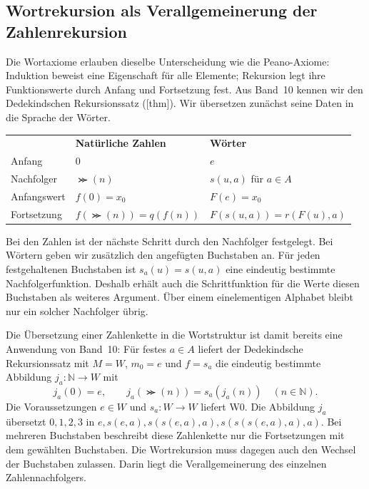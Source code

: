 \subsection{Wortrekursion als Verallgemeinerung der Zahlenrekursion}

Die Wortaxiome erlauben dieselbe Unterscheidung wie die Peano-Axiome:
Induktion beweist eine Eigenschaft für alle Elemente; Rekursion legt
ihre Funktionswerte durch Anfang und Fortsetzung fest. Aus Band~10
kennen wir den Dedekindschen Rekursionssatz
([thm]). Wir übersetzen zunächst
seine Daten in die Sprache der Wörter.

\begingroup
\renewcommand{\arraystretch}{1.2}
\setlength{\tabcolsep}{4pt}
\noindent\begin{tabular}{@{}p{.21\linewidth}p{.32\linewidth}p{.41\linewidth}@{}}
 & \textbf{Natürliche Zahlen} & \textbf{Wörter} \\
Anfang & \(0\) & \(e\) \\
Nachfolger & \(\Succ(n)\) & \(s(u,a)\) für \(a\in A\) \\
Anfangswert & \(f(0)=x_0\) & \(F(e)=x_0\) \\
Fortsetzung & \(f(\Succ(n))=q(f(n))\)
  & \(F(s(u,a))=r(F(u),a)\)
\end{tabular}\par
\endgroup

Bei den Zahlen ist der nächste Schritt durch den Nachfolger festgelegt.
Bei Wörtern geben wir zusätzlich den angefügten Buchstaben an. Für
jeden festgehaltenen Buchstaben ist \(s_a(u)=s(u,a)\) eine eindeutig
bestimmte Nachfolgerfunktion. Deshalb erhält auch die Schrittfunktion
für die Werte diesen Buchstaben als weiteres Argument. Über einem
einelementigen Alphabet bleibt nur ein solcher Nachfolger übrig.

Die Übersetzung einer Zahlenkette in die Wortstruktur ist damit bereits
eine Anwendung von Band~10: Für festes \(a\in A\) liefert der
Dedekindsche Rekursionssatz mit \(M=W\), \(m_0=e\) und \(f=s_a\)
die eindeutig bestimmte Abbildung
\(j_a\colon\mathbb N\to W\) mit
\[
  j_a(0)=e,\qquad j_a(\Succ(n))=s_a(j_a(n))
  \quad(n\in\mathbb N).
\]
Die Voraussetzungen \(e\in W\) und \(s_a\colon W\to W\) liefert W0.
Die Abbildung \(j_a\) übersetzt \(0,1,2,3\) in
\(e,s(e,a),s(s(e,a),a),s(s(s(e,a),a),a)\).
Bei mehreren Buchstaben beschreibt diese Zahlenkette nur die
Fortsetzungen mit dem gewählten Buchstaben. Die Wortrekursion muss
dagegen auch den Wechsel der Buchstaben zulassen. Darin liegt die
Verallgemeinerung des einzelnen Zahlennachfolgers.

